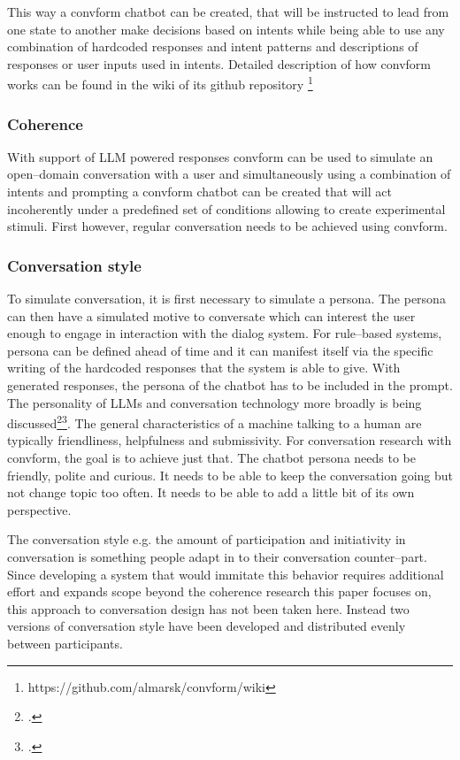 \documentclass[12pt]{report}
\begin{document}
{\par
This way a convform chatbot can be created,
that will be instructed to lead from one state to another
make decisions based on intents
while being able to use any combination of
hardcoded responses and intent patterns
and descriptions of responses or user inputs used in intents.
Detailed description of how convform works can be found
in the wiki of its github repository \footnote{https://github.com/almarsk/convform/wiki}

\subsubsection{Coherence}
With support of LLM powered responses
convform can be used to simulate
an open–domain conversation with a user
and simultaneously using a combination
of intents and prompting
a convform chatbot can be created
that will act incoherently under a predefined set of conditions
allowing to create experimental stimuli.
First however, regular conversation needs to be achieved using convform.

\subsubsection{Conversation style}

To simulate conversation, it is first necessary to simulate a persona.
The persona can then have a simulated motive to conversate
which can interest the user enough to engage in interaction with the dialog system.
For rule–based systems, persona can be defined ahead of time
and it can manifest itself via the specific writing of the hardcoded responses
that the system is able to give.
With generated responses, the persona of the chatbot has to be included in the prompt.
The personality of LLMs and conversation technology more broadly
is being discussed\footcite{gpttoxicity}\footcite{robopersona}.
The general characteristics of a machine talking to a human are typically
friendliness, helpfulness and submissivity.
For conversation research with convform,
the goal is to achieve just that.
The chatbot persona needs to be friendly,
polite and curious.
It needs to be able to keep the conversation going
but not change topic too often.
It needs to be able to add a little bit of its own perspective.
\par
The conversation style e.g. the amount of participation and initiativity in conversation
is something people adapt in to their conversation counter–part.
Since developing a system that would immitate this behavior
requires additional effort
and expands scope beyond the coherence research
this paper focuses on,
this approach to conversation design
has not been taken here.
Instead two versions of conversation style
have been developed
and distributed evenly between participants.

}
\end{document}
